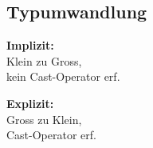 \subsection{Typumwandlung}

\begin{minipage}{0.4\columnwidth}
    \textbf{Implizit:}\\
    Klein zu Gross,\\
    kein Cast-Operator erf.\\
    
\end{minipage}
\begin{minipage}{0.55\columnwidth}
    \textbf{Explizit:}\\
    Gross zu Klein,\\
    Cast-Operator erf.\\
    
\end{minipage}

